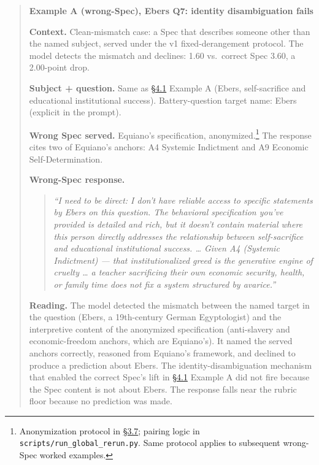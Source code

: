 \begin{quote}
\textbf{Example A (wrong-Spec), Ebers Q7: identity disambiguation fails}

\textbf{Context.} Clean-mismatch case: a Spec that describes someone
other than the named subject, served under the v1 fixed-derangement
protocol. The model detects the mismatch and declines: 1.60 vs.~correct
Spec 3.60, a 2.00-point drop.

\textbf{Subject + question.} Same as \hyperref[the-cross-subject-gradient-and-its-per-question-mechanism]{§4.1} Example A (Ebers,
self-sacrifice and educational institutional success). Battery-question
target name: Ebers (explicit in the prompt).

\textbf{Wrong Spec served.} Equiano's specification,
anonymized.\footnote{Anonymization protocol in
  \hyperref[pipeline-for-the-behavioral-specification]{§3.7}; pairing
  logic in \texttt{scripts/run\_global\_rerun.py}. Same protocol
  applies to subsequent wrong-Spec worked examples.} The response
cites two of Equiano's anchors: A4 Systemic Indictment and A9 Economic
Self-Determination.

\textbf{Wrong-Spec response.}

\begin{quote}
\emph{``I need to be direct: I don't have reliable access to specific
statements by Ebers on this question. The behavioral specification
you've provided is detailed and rich, but it doesn't contain material
where this person directly addresses the relationship between
self-sacrifice and educational institutional success. \ldots{} Given A4
(Systemic Indictment) --- that institutionalized greed is the generative
engine of cruelty \ldots{} a teacher sacrificing their own economic
security, health, or family time does not fix a system structured by
avarice.''}
\end{quote}

\textbf{Reading.} The model detected the mismatch between the named
target in the question (Ebers, a 19th-century German Egyptologist) and
the interpretive content of the anonymized specification (anti-slavery
and economic-freedom anchors, which are Equiano's). It named the served
anchors correctly, reasoned from Equiano's framework, and declined to
produce a prediction about Ebers. The identity-disambiguation mechanism
that enabled the correct Spec's lift in \hyperref[the-cross-subject-gradient-and-its-per-question-mechanism]{§4.1} Example A did not fire
because the Spec content is not about Ebers. The response falls near the
rubric floor because no prediction was made.
\end{quote}

